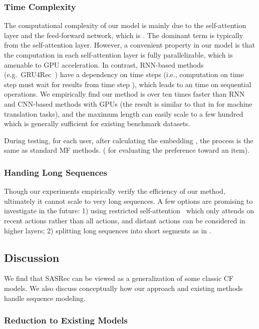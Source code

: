 \documentclass[conference]{IEEEtran}
\newcommand{\xhdr}[1]{\subsubsection*{\bf #1}}
\begin{document}
\xhdr{Time Complexity} The computational complexity of our model is mainly 
due to
the self-attention layer and the feed-forward network, which is . The dominant term is typically  from the self-attention layer. However, a 
convenient
property in our model is that the computation in each self-attention layer is fully parallelizable, which is 
amenable to
GPU acceleration. In contrast, RNN-based methods (e.g.~GRU4Rec~\cite{DBLP:journals/corr/HidasiKBT15}) have a
dependency on time steps (i.e., computation on time step  must wait for results from time step ), which leads to an  time on sequential operations. 
We empirically find our method is over ten times faster than RNN and CNN-based methods with GPUs (the result is similar to that in \cite{transform} for machine translation tasks), and the maximum length  can easily scale to a few hundred which is generally sufficient for existing benchmark datasets.

During testing, for each user, after calculating the embedding 
, the 
process is the same as standard MF methods. ( for evaluating the preference toward an item).

\xhdr{Handing 
Long Sequences} Though our experiments empirically verify the efficiency of our method, ultimately it cannot scale to very long sequences. A few options are promising to 
investigate
in the future: 1) using 
restricted self-attention~\cite{poveytime} which only attends on
recent actions rather than all actions, and distant actions can be considered in higher layers; 2) splitting long sequences into short segments as in \cite{DBLP:conf/wsdm/TangW18}.






\subsection{Discussion}

We find
that
SASRec can be viewed as a generalization 
of some classic CF models. We also discuss 
conceptually
how our approach and existing methods handle sequence modeling.

\xhdr{Reduction to Existing Models}
\end{document}

